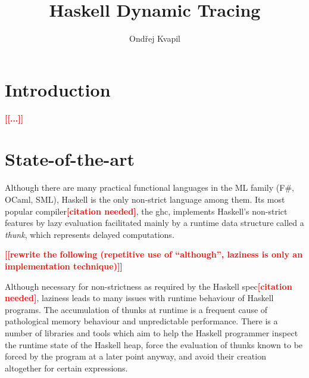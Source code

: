 \documentclass[thesis=B,english]{FITthesis}[2019/12/23]
\title{Haskell Dynamic Tracing}
\author{Ondřej Kvapil} %
\newcommand{\todo}[1]{\textcolor{red}{\textbf{[[#1]]}}}
\newcommand{\citationNeeded}{\textcolor{red}{\textbf{[citation needed]}}}
\begin{document}


\chapter{Introduction} \label{sec:intro}
\todo{...}


\chapter{State-of-the-art} \label{sec:state-of-the-art}
Although there are many practical functional languages in the ML family (F\#,
OCaml, SML), Haskell is the only non-strict language among them. Its most
popular compiler\citationNeeded, the \acrfull{ghc}, implements Haskell's
non-strict features by lazy evaluation facilitated mainly by a runtime data
structure called a \textit{thunk}, which represents delayed computations.

\todo{rewrite the following (repetitive use of ``although'', laziness is only
an implementation technique)}

Although necessary for non-strictness as required by the Haskell
spec\citationNeeded, laziness leads to many issues with runtime behaviour of
Haskell programs. The accumulation of thunks at runtime is a frequent cause of
pathological memory behaviour and unpredictable performance. There is a number
of libraries and tools which aim to help the Haskell programmer inspect the
runtime state of the Haskell heap, force the evaluation of thunks known to be
forced by the program at a later point anyway, and avoid their creation
altogether for certain expressions.
\end{document}
